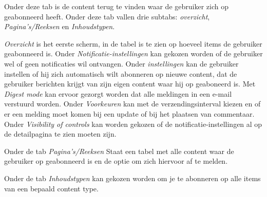Onder deze tab is de content terug te vinden waar de gebruiker zich op geabonneerd heeft. Onder deze tab vallen drie subtabs: \emph{overzicht}, \emph{Pagina's/Reeksen} en \emph{Inhoudstypen}.

\emph{Overzicht} is het eerste scherm, in de tabel is te zien op hoeveel items de gebruiker geabonneerd is. Onder \emph{Notificatie-instellingen} kan gekozen worden of de gebruiker wel of geen notificaties wil ontvangen. Onder \emph{instellingen} kan de gebruiker instellen of hij zich automatisch wilt abonneren op nieuwe content, dat de gebruiker berichten krijgt van zijn eigen content waar hij op geaboneerd is. Met \emph{Digest mode} kan ervoor gezorgt worden dat alle meldingen in een e-mail verstuurd worden. Onder \emph{Voorkeuren} kan met de verzendingsinterval kiezen en of er een melding moet komen bij een update of bij het plaatsen van commentaar. Onder \emph{Visibility of controls} kan worden gekozen of de notificatie-instellingen al op de detailpagina te zien moeten zijn.

Onder de tab \emph{Pagina's/Reeksen} Staat een tabel met alle content waar de gebruiker op geabonneerd is en de optie om zich hiervoor af te melden.

Onder de tab \emph{Inhoudstypen} kan gekozen worden om je te abonneren op alle items van een bepaald content type.